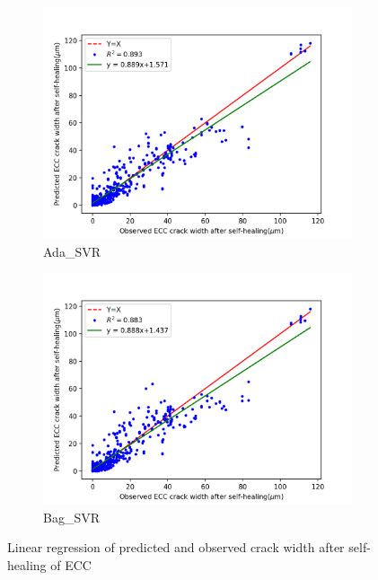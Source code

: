 \documentclass[11pt]{article}
\begin{document}
\begin{figure}[!h]
\begin{subfigure}{.35\textwidth}
			\includegraphics[width = \linewidth]{02Ada_SVR.png}
			\caption{Ada\_SVR}
		    \end{subfigure}%
		\hspace{-1.4em}
		    \begin{subfigure}{.35\textwidth}
			\centering
			\includegraphics[width = \linewidth]{02Bag_SVR.png}
			\caption{Bag\_SVR}
	    	\end{subfigure}%
		\hspace{-1em}
		\caption{Linear regression of predicted and observed crack width after self-healing of ECC}\label{gbrt}
	\end{figure}
	
\end{document}
